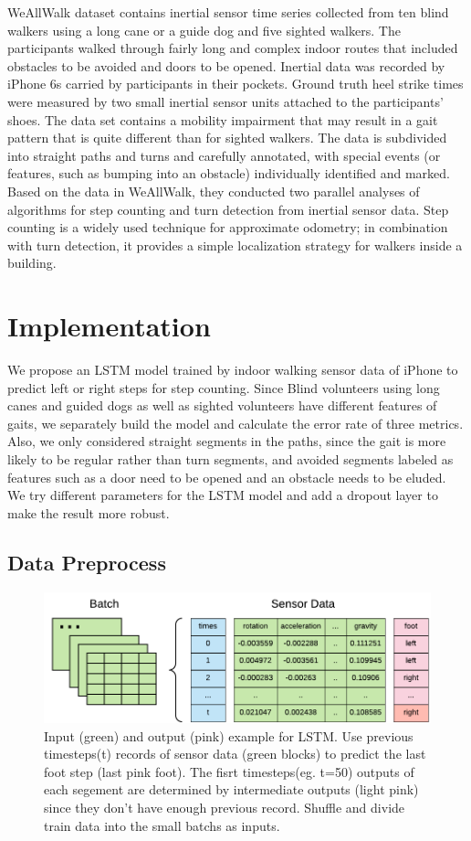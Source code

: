 \documentclass[11pt]{article}
\begin{document}
WeAllWalk dataset \cite{flores2016weallwalk} contains inertial sensor time series collected from ten blind walkers using a long cane or a guide dog and five sighted walkers. The participants walked through fairly long and complex indoor routes that included obstacles to be avoided and doors to be opened. Inertial data was recorded by iPhone 6s carried by participants in their pockets. Ground truth heel strike times were measured by two small inertial sensor units attached to the participants’ shoes. The data set contains a mobility impairment that may result in a gait pattern that is quite different than for sighted walkers. The data is subdivided into straight paths and turns and carefully annotated, with special events (or features, such as bumping into an obstacle) individually identified and marked. Based on the data in WeAllWalk, they conducted two parallel analyses of algorithms for step counting and turn detection from inertial sensor data. Step counting is a widely used technique for approximate odometry; in combination with turn detection, it provides a simple localization strategy for walkers inside a building. 


\section{Implementation}
We propose an LSTM model trained by indoor walking sensor data of iPhone to predict left or right steps for step counting. Since Blind volunteers using long canes and guided dogs as well as sighted volunteers have different features of gaits, we separately build the model and calculate the error rate of three metrics. Also, we only considered straight segments in the paths, since the gait is more likely to be regular rather than turn segments, and avoided segments labeled as features such as a door need to be opened and an obstacle needs to be eluded. We try different parameters for the LSTM model and add a dropout layer to make the result more robust.

\subsection{Data Preprocess}

\begin{figure}[ht]
\centering
\includegraphics[scale=1]{input2}
\caption{Input (green) and output (pink) example for LSTM. Use previous timesteps(t) records of sensor data (green blocks) to predict the last foot step (last pink foot). The fisrt timesteps(eg. t=50) outputs of each segement are determined by intermediate outputs (light pink) since they don't have enough previous record. Shuffle and divide train data into the small batchs as inputs.}
\label{fig:batch_sensor_data}
\end{figure}
\end{document}
